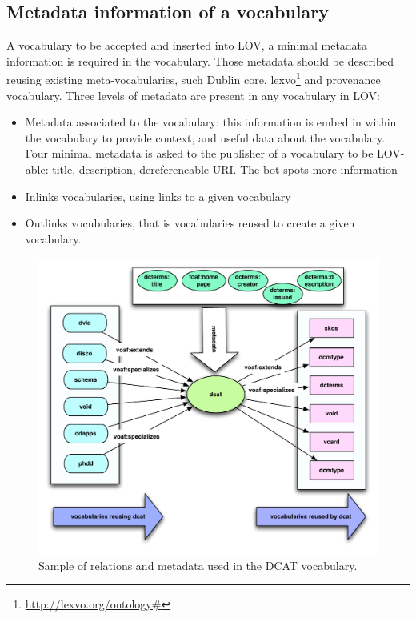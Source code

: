 \documentclass{iosart2c}
\begin{document}
\subsection{Metadata information of a vocabulary}
A vocabulary to be accepted and inserted into LOV, a minimal metadata information is required in the vocabulary. Those metadata should be described reusing existing meta-vocabularies, such Dublin core, lexvo\footnote{\url{http://lexvo.org/ontology#}} and provenance vocabulary.
Three levels of metadata are present in any vocabulary in LOV:
\begin{itemize}
\item Metadata associated to the vocabulary: this information is embed in within the vocabulary to provide context, and useful data about the vocabulary. Four minimal metadata is asked to the publisher of a vocabulary to be LOV-able: title, description, dereferencable URI. The bot spots more information 

\item Inlinks vocabularies, using links to a given vocabulary

\item Outlinks vocubularies, that is vocabularies reused to create a given vocabulary.  
\end{itemize}

\begin{figure}[ht!b]
\includegraphics[scale=0.4]{dcat-relations.pdf}
\caption{Sample of relations and metadata used in the DCAT vocabulary.}
\label{fig:dcat}
\end{figure}
\end{document}
